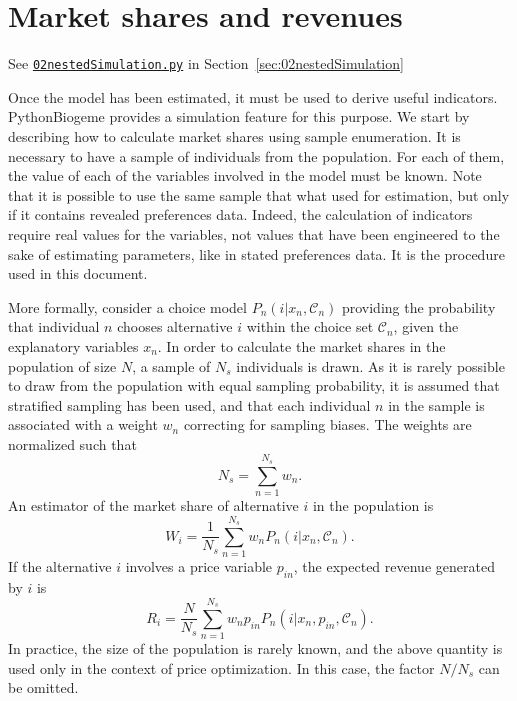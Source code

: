 \documentclass[12pt,a4paper]{article}
\newcommand{\C}{\mathcal{C}}
\begin{document}
\section{Market shares and revenues}

\begin{flushright}
See \href{http://biogeme.epfl.ch/examples/indicators/python/02nestedSimulation.py}{\lstinline$02nestedSimulation.py$} in Section~\ref{sec:02nestedSimulation}
\end{flushright}


Once the model has been estimated, it must be used to derive useful
indicators. PythonBiogeme provides a simulation feature for this
purpose. We start by describing how to calculate market shares using
sample enumeration. It is necessary to have a sample of individuals
from the population. For each of them, the value of each of the
variables involved in the model must be known.  Note that it is possible to use the same sample
that what used for estimation, but only if it contains revealed
preferences data. Indeed, the calculation of indicators require real
values for the variables, not values that have been engineered to the
sake of estimating parameters, like in stated preferences data. It is the procedure used in this document. 


More formally, consider a choice model $P_n(i|x_n, \C_n)$ providing
the probability that individual $n$ chooses alternative $i$ within the
choice set $\C_n$, given the explanatory variables $x_n$.  In order to
calculate the market shares in the population of size $N$, a sample of
$N_s$ individuals is drawn. As it is rarely possible to draw from the
population with equal sampling probability, it is assumed that
stratified sampling has been used, and that each individual $n$ in the
sample is associated with a weight $w_n$ correcting for sampling
biases. The weights are normalized such that
\begin{equation}
  \label{eq:normalizingWeights}
N_s = \sum_{n=1}^{N_s} w_n.
\end{equation}
An estimator of the market share of alternative $i$ in the population is
\begin{equation}
  \label{eq:marketShare}
W_i = \frac{1}{N_s} \sum_{n=1}^{N_s} w_n P_n(i|x_n, \C_n).
\end{equation}
If the alternative $i$ involves a price variable $p_{in}$, the expected revenue
generated by $i$ is
\begin{equation}
\label{eq:revenues}
R_i = \frac{N}{N_s} \sum_{n=1}^{N_s} w_n p_{in} P_n(i|x_n, p_{in}, \C_n).
\end{equation}
In practice, the size of the population is rarely known, and the above
quantity is used only in the context of price optimization. In this
case, the factor $N/N_s$ can be omitted. 
\end{document}
